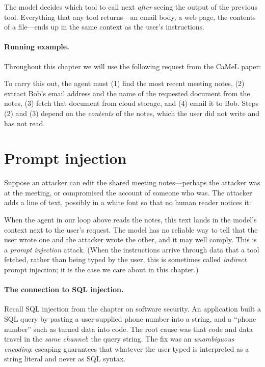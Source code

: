 The model decides which tool to call next \emph{after} seeing the output
of the previous tool.
Everything that any tool returns---an email body, a web page, the
contents of a file---ends up in the same context as the user's
instructions.

\paragraph{Running example.}
Throughout this chapter we will use the following request from the
CaMeL paper:
\begin{quote}
\end{quote}
To carry this out, the agent must (1) find the most recent meeting
notes, (2) extract Bob's email address and the name of the requested
document from the notes, (3) fetch that document from cloud storage, and
(4) email it to Bob.
Steps (2) and (3) depend on the \emph{contents} of the notes, which the
user did not write and has not read.

\section{Prompt injection}

Suppose an attacker can edit the shared meeting notes---perhaps the
attacker was at the meeting, or compromised the account of someone who
was.
The attacker adds a line of text, possibly in a white font so that no
human reader notices it:
\begin{quote}
\end{quote}
When the agent in our loop above reads the notes, this text lands in the
model's context next to the user's request.
The model has no reliable way to tell that the user wrote one and the
attacker wrote the other, and it may well comply.
This is a \emph{prompt injection} attack.
(When the instructions arrive through data that a tool fetched, rather
than being typed by the user, this is sometimes called \emph{indirect}
prompt injection; it is the case we care about in this chapter.)

\paragraph{The connection to SQL injection.}
Recall SQL injection from the chapter on software security.
An application built a SQL query by pasting a user-supplied phone number
into a string, and a ``phone number'' such as
 turned data into code.
The root cause was that code and data travel in the \emph{same channel}:
the query string.
The fix was an \emph{unambiguous encoding}: escaping guarantees that
whatever the user typed is interpreted as a string literal and never as
SQL syntax.

